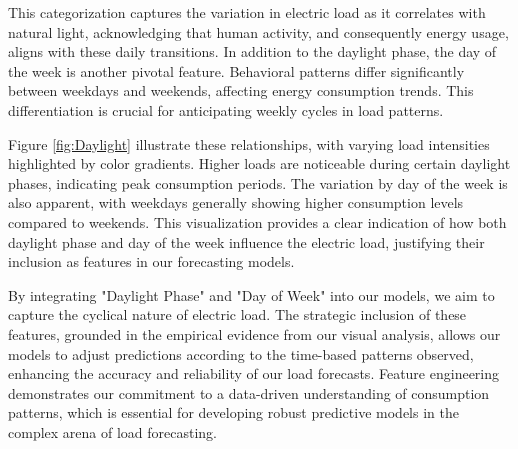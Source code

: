 \documentclass{article} %
\begin{document}
This categorization captures the variation in electric load as it correlates with natural light, acknowledging that human activity, and consequently energy usage, aligns with these daily transitions. In addition to the daylight phase, the day of the week is another pivotal feature. Behavioral patterns differ significantly between weekdays and weekends, affecting energy consumption trends. This differentiation is crucial for anticipating weekly cycles in load patterns. 

Figure \ref{fig:Daylight} illustrate these relationships, with varying load intensities highlighted by color gradients. Higher loads are noticeable during certain daylight phases, indicating peak consumption periods. The variation by day of the week is also apparent, with weekdays generally showing higher consumption levels compared to weekends. This visualization provides a clear indication of how both daylight phase and day of the week influence the electric load, justifying their inclusion as features in our forecasting models. 

By integrating "Daylight Phase" and "Day of Week" into our models, we aim to capture the cyclical nature of electric load. The strategic inclusion of these features, grounded in the empirical evidence from our visual analysis, allows our models to adjust predictions according to the time-based patterns observed, enhancing the accuracy and reliability of our load forecasts. Feature engineering demonstrates our commitment to a data-driven understanding of consumption patterns, which is essential for developing robust predictive models in the complex arena of load forecasting. 
\end{document}
